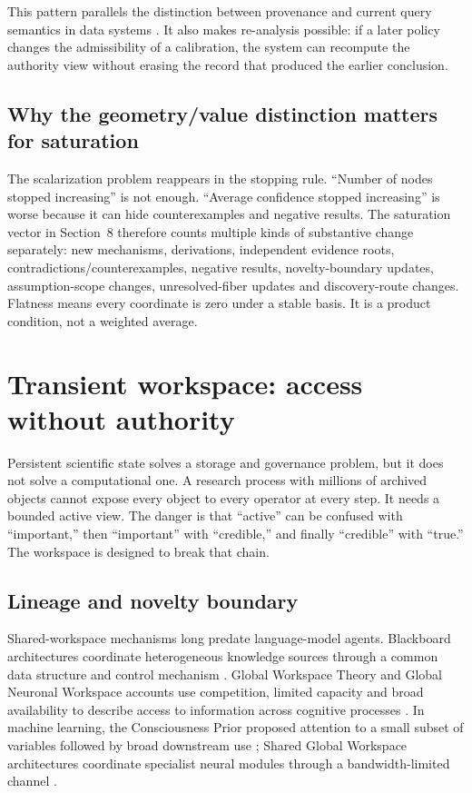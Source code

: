 \documentclass[11pt]{article}
\begin{document}
This pattern parallels the distinction between provenance and current query semantics in data systems \cite{buneman2001,green2007,prov2013}. It also makes re-analysis possible: if a later policy changes the admissibility of a calibration, the system can recompute the authority view without erasing the record that produced the earlier conclusion.

\subsection{Why the geometry/value distinction matters for saturation}

The scalarization problem reappears in the stopping rule. ``Number of nodes stopped increasing'' is not enough. ``Average confidence stopped increasing'' is worse because it can hide counterexamples and negative results. The saturation vector in Section~8 therefore counts multiple kinds of substantive change separately: new mechanisms, derivations, independent evidence roots, contradictions/counterexamples, negative results, novelty-boundary updates, assumption-scope changes, unresolved-fiber updates and discovery-route changes. Flatness means every coordinate is zero under a stable basis. It is a product condition, not a weighted average.

\section{Transient workspace: access without authority}

Persistent scientific state solves a storage and governance problem, but it does not solve a computational one. A research process with millions of archived objects cannot expose every object to every operator at every step. It needs a bounded active view. The danger is that ``active'' can be confused with ``important,'' then ``important'' with ``credible,'' and finally ``credible'' with ``true.'' The workspace is designed to break that chain.

\subsection{Lineage and novelty boundary}

Shared-workspace mechanisms long predate language-model agents. Blackboard architectures coordinate heterogeneous knowledge sources through a common data structure and control mechanism \cite{hayesroth1985,nii1986}. Global Workspace Theory and Global Neuronal Workspace accounts use competition, limited capacity and broad availability to describe access to information across cognitive processes \cite{baars1988,dehaene2001,mashour2020}. In machine learning, the Consciousness Prior proposed attention to a small subset of variables followed by broad downstream use \cite{bengio2017}; Shared Global Workspace architectures coordinate specialist neural modules through a bandwidth-limited channel \cite{goyal2021}.
\end{document}
